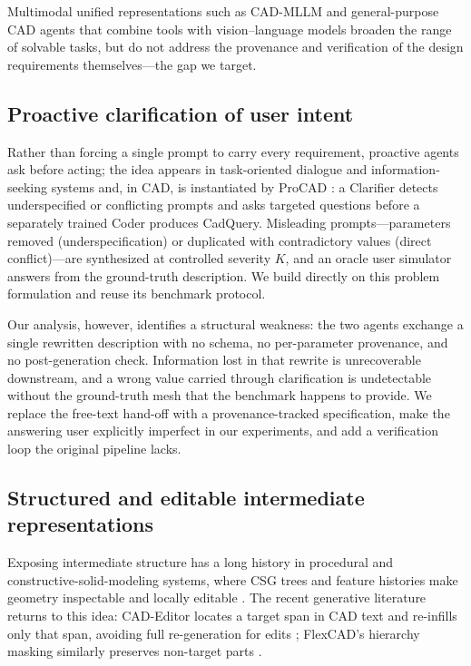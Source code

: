 Multimodal unified representations such as CAD-MLLM \cite{cadmllm} and
general-purpose CAD agents that combine tools with vision--language models
\cite{caddesigner,cadassistant} broaden the range of solvable tasks, but do
not address the provenance and verification of the design requirements
themselves---the gap we target.

\subsection{Proactive clarification of user intent}\label{sec:related:clarify}

Rather than forcing a single prompt to carry every requirement, proactive
agents ask before acting; the idea appears in task-oriented dialogue and
information-seeking systems \cite{clarify_general} and, in CAD, is
instantiated by ProCAD \cite{procad}: a Clarifier detects underspecified or
conflicting prompts and asks targeted questions before a separately trained
Coder produces CadQuery. Misleading prompts---parameters removed
(underspecification) or duplicated with contradictory values (direct
conflict)---are synthesized at controlled severity $K$, and an oracle user
simulator answers from the ground-truth description. We build directly on
this problem formulation and reuse its benchmark protocol.

Our analysis, however, identifies a structural weakness: the two agents
exchange a single rewritten description with no schema, no per-parameter
provenance, and no post-generation check. Information lost in that rewrite is
unrecoverable downstream, and a wrong value carried through clarification is
undetectable without the ground-truth mesh that the benchmark happens to
provide. We replace the free-text hand-off with a provenance-tracked
specification, make the answering user explicitly imperfect in our
experiments, and add a verification loop the original pipeline lacks.

\subsection{Structured and editable intermediate representations}
\label{sec:related:structured}

Exposing intermediate structure has a long history in procedural and
constructive-solid-modeling systems, where CSG trees and feature histories
make geometry inspectable and locally editable
\cite{requicha,featurescript,openscad}. The recent generative literature
returns to this idea: CAD-Editor locates a target span in CAD text and
re-infills only that span, avoiding full re-generation for edits
\cite{cadeditor}; FlexCAD's hierarchy masking similarly preserves non-target
parts \cite{flexcad}.

